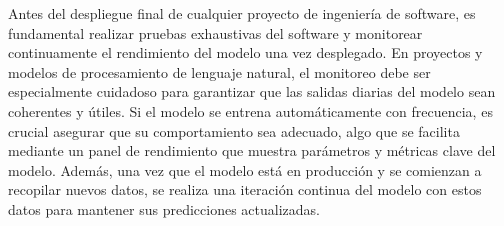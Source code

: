 Antes del despliegue final de cualquier proyecto de ingeniería de software, es fundamental realizar pruebas exhaustivas del software y monitorear continuamente el rendimiento del modelo una vez desplegado. En proyectos y modelos de procesamiento de lenguaje natural, el monitoreo debe ser especialmente cuidadoso para garantizar que las salidas diarias del modelo sean coherentes y útiles. Si el modelo se entrena automáticamente con frecuencia, es crucial asegurar que su comportamiento sea adecuado, algo que se facilita mediante un panel de rendimiento que muestra parámetros y métricas clave del modelo. Además, una vez que el modelo está en producción y se comienzan a recopilar nuevos datos, se realiza una iteración continua del modelo con estos datos para mantener sus predicciones actualizadas.